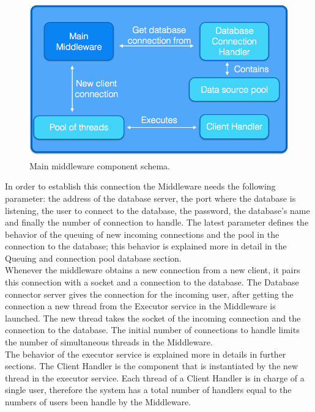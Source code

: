 \begin{figure}[h!]
	\centering
	\includegraphics[scale=0.3]{midleware.png}
	\caption{Main middleware component schema.}
	\label{middle}
\end{figure}


In order to establish this connection the Middleware needs the following parameter: the address of the database server, the port where the database is listening, the user to connect to the database, the password, the database’s name and finally the number of connection to handle. The latest parameter defines the behavior of the queuing of new incoming connections and the pool in the connection to the database; this behavior is explained more in detail in the Queuing and connection pool database section.\\
 
Whenever the middleware obtains a new connection from a new client, it pairs this connection with a socket and a connection to the database. The Database connector server gives the connection for the incoming user, after getting the connection a new thread from the Executor service in the Middleware is launched. The new thread takes the socket of the incoming connection and the connection to the database. The initial number of connections to handle limits the number of simultaneous threads in the Middleware.\\

The behavior of the executor service is explained more in details in further sections. The Client Handler is the component that is instantiated by the new thread in the executor service. Each thread of a Client Handler is in charge of a single user, therefore the system has a total number of handlers equal to the numbers of users been handle by the Middleware.\\

